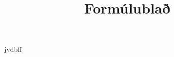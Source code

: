 \documentclass[9pt,a4paper,landscape,oneside]{amsart}
\title{Formúlublað}
\subtitle{}
\date{\ddmmyyyydate{\today{}}}
\theoremstyle{plain}
\theoremstyle{definition}
\theoremstyle{remark}
\begin{document}
\thispagestyle{fancy}
\raggedright
\footnotesize
\raggedcolumns
\begin{multicols*}{3}
  \setlength{\premulticols}{1pt}
  \setlength{\postmulticols}{1pt}
  \setlength{\multicolsep}{1pt}
  \setlength{\columnsep}{2pt}
  jvdbff
\end{multicols*}
\end{document}
